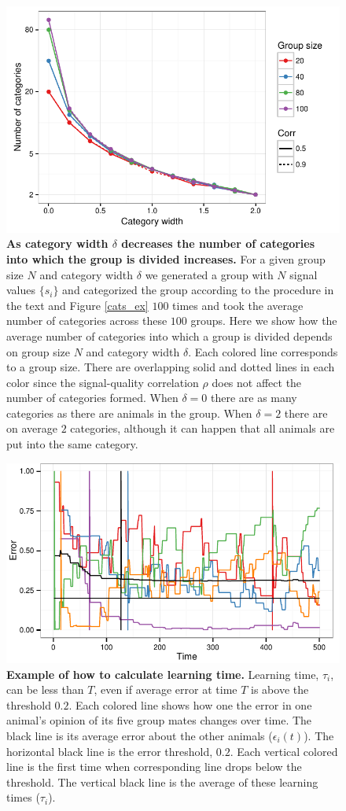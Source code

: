 \begin{figure}[ht]
\includegraphics[width=.8\textwidth]{figures/number_of_categories.pdf}
\caption{\sffamily\small\textbf{As category width $\delta$ decreases the number of categories into which the group is divided increases.}
For a given group size $N$ and category width $\delta$ we generated a group with $N$ signal values $\{s_i\}$ and categorized the group according to the procedure in the text and Figure \ref{cats_ex} $100$ times and took the average number of categories across these $100$ groups. Here we show how the average number of categories into which a group is divided depends on group size $N$ and category width $\delta$.  Each colored line corresponds to a group size. There are overlapping solid and dotted lines in each color since the signal-quality correlation $\rho$ does not affect the number of categories formed. When $\delta=0$ there are as many categories as there are animals in the group. When $\delta=2$ there are on average $2$ categories, although it can happen that all animals are put into the same category. }
\label{num_cat}
\end{figure}

\begin{figure}[ht]
\includegraphics[width=.8\textwidth]{figures/learning_time_example.pdf}
\caption{\label{learnT.ex} \sffamily\small\textbf{Example of how to calculate learning time.} Learning time, $\tau_i$, can be less than $T$, even if average error at time $T$ is above the threshold $0.2$. Each colored line shows how one the error in one animal's opinion of its five group mates changes over time. The black line is its average error about the other animals ($\epsilon_i(t)$). The horizontal black line is the error threshold, $0.2$. Each vertical colored line is the first time when corresponding line drops below the threshold. The vertical black line is the average of these learning times  ($\tau_i$).}
\end{figure}

